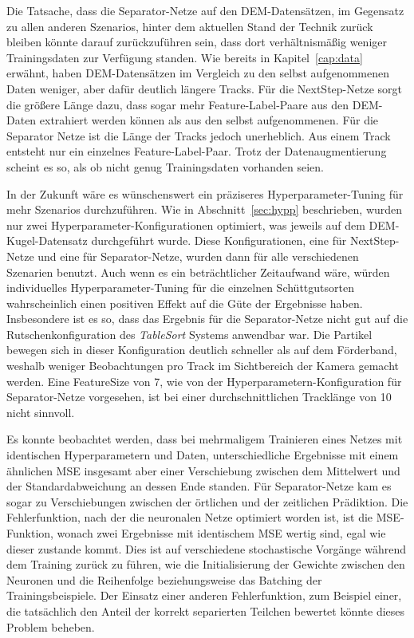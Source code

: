 
Die Tatsache, dass die Separator-Netze auf den DEM-Datensätzen, im Gegensatz zu allen anderen Szenarios,
hinter dem aktuellen Stand der Technik zurück bleiben könnte darauf zurückzuführen sein, 
dass dort verhältnismäßig weniger Trainingsdaten zur Verfügung standen.
Wie bereits in Kapitel~\ref{cap:data} erwähnt, haben DEM-Datensätzen im Vergleich zu den selbst aufgenommenen Daten weniger, aber dafür deutlich längere Tracks.
Für die NextStep-Netze sorgt die größere Länge dazu, dass sogar mehr Feature-Label-Paare aus den DEM-Daten extrahiert werden können als aus den selbst aufgenommenen.
Für die Separator Netze ist die Länge der Tracks jedoch unerheblich.
Aus einem Track entsteht nur ein einzelnes Feature-Label-Paar.
Trotz der Datenaugmentierung scheint es so, als ob nicht genug Trainingsdaten vorhanden seien.


In der Zukunft wäre es wünschenswert ein präziseres Hyperparameter-Tuning für mehr Szenarios durchzuführen.
Wie in Abschnitt~\ref{sec:hypp} beschrieben, wurden nur zwei Hyperparameter-Konfigurationen optimiert, was jeweils auf dem DEM-Kugel-Datensatz durchgeführt wurde.
Diese Konfigurationen, eine für NextStep-Netze und eine für Separator-Netze,  wurden dann für alle verschiedenen Szenarien benutzt.
Auch wenn es ein beträchtlicher Zeitaufwand wäre, würden individuelles Hyperparameter-Tuning für die einzelnen Schüttgutsorten wahrscheinlich einen positiven Effekt auf die Güte der Ergebnisse haben.
Insbesondere ist es so, dass das Ergebnis für die Separator-Netze nicht gut auf die Rutschenkonfiguration des \textit{TableSort} Systems anwendbar war.
Die Partikel bewegen sich in dieser Konfiguration deutlich schneller als auf dem Förderband, weshalb weniger Beobachtungen pro Track im Sichtbereich der Kamera gemacht werden.
Eine FeatureSize von 7, wie von der Hyperparametern-Konfiguration für Separator-Netze vorgesehen, ist bei einer durchschnittlichen Tracklänge von 10 nicht sinnvoll.


Es konnte beobachtet werden, dass bei mehrmaligem Trainieren eines Netzes 
mit identischen Hyperparametern und Daten, unterschiedliche Ergebnisse mit einem ähnlichen MSE insgesamt aber einer Verschiebung zwischen dem Mittelwert und der Standardabweichung  
an dessen Ende standen.
Für Separator-Netze kam es sogar zu Verschiebungen zwischen der örtlichen und der zeitlichen Prädiktion.
Die Fehlerfunktion, nach der die neuronalen Netze optimiert worden ist, ist die MSE-Funktion, wonach zwei Ergebnisse mit identischem MSE wertig sind, egal wie dieser zustande kommt.
Dies ist auf verschiedene stochastische Vorgänge während dem Training zurück zu führen, wie die Initialisierung der Gewichte zwischen den Neuronen und die Reihenfolge beziehungsweise das Batching der Trainingsbeispiele.
Der Einsatz einer anderen Fehlerfunktion, zum Beispiel einer, die tatsächlich den Anteil der korrekt separierten Teilchen bewertet könnte dieses Problem beheben.
